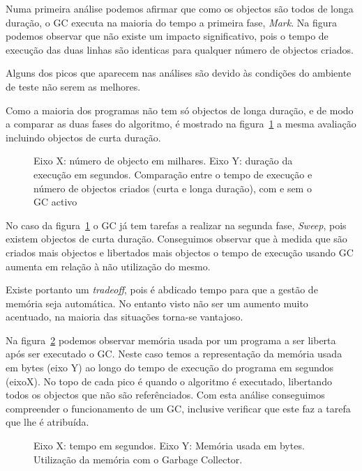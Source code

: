\documentclass{article}
\begin{document}
Numa primeira análise podemos afirmar que como os objectos são todos de longa duração, o GC executa na maioria do tempo a primeira fase, \emph{Mark}.
Na figura podemos observar que não existe um impacto significativo, pois o tempo de execução das duas linhas são identicas para qualquer número de objectos criados.

Alguns dos picos que aparecem nas análises são devido às condições do ambiente de teste não serem as melhores.

Como a maioria dos programas não tem só objectos de longa duração, e de modo a comparar as duas fases do algoritmo, é mostrado na figura~\ref{graph:graph2} a mesma avaliação incluindo objectos de curta duração.


\begin{figure}[h!]
  \begin{center}
    
    \caption{Eixo X: número de objecto em milhares. Eixo Y: duração da execução em segundos. Comparação entre o tempo de execução e número de objectos criados (curta e longa duração), com  e sem o  GC activo}
    \label{graph:graph2}
  \end{center}
\end{figure}

No caso da figura~\ref{graph:graph2} o GC já tem tarefas a realizar na segunda fase, \emph{Sweep}, pois existem objectos de curta duração.
Conseguimos observar que à medida que são criados mais objectos e libertados mais objectos o tempo de execução usando GC aumenta em relação à não utilização do mesmo.

Existe portanto um \emph{tradeoff}, pois é abdicado tempo para que a gestão de memória seja automática. No entanto visto não ser um aumento muito acentuado, na maioria das situações torna-se vantajoso.

Na figura~\ref{graph:graph3} podemos observar memória usada por um programa a ser liberta após ser executado o GC. Neste caso temos a representação da memória usada em bytes (eixo Y) ao longo do tempo de execução do programa em segundos (eixoX). No topo de cada pico é quando o algoritmo é executado, libertando todos os objectos que não são referênciados.
Com esta análise conseguimos compreender o funcionamento de um GC, inclusive verificar que este faz a tarefa que lhe é atribuída.

\begin{figure}[h!]
  \begin{center}
    
    \caption{Eixo X: tempo em segundos. Eixo Y: Memória usada em bytes. Utilização da memória com o Garbage Collector.}
    \label{graph:graph3}
  \end{center}
\end{figure}
\end{document}
